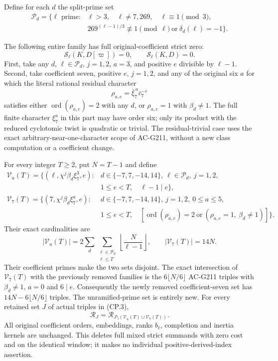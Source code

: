 Define for each $d$ the split-prime set
\[
 \begin{split}
 \mathscr P_d=\{\ell\text{ prime}:{}&\ell>3,\quad\ell\ne7,269,
       \quad\ell\equiv1\pmod3,\\
       &269^{(\ell-1)/3}\not\equiv1\pmod\ell
                            \ \text{or}\ \delta_d(\ell)=-1\}.
 \end{split}
 \tag{MQS.5}
\]

\begin{theorem}
\label{AC-G217}
The following entire family has full original-coefficient strict zero:
\[
                  \mathcal S_\ell(K,D[\varpi])=0,
                  \qquad\mathcal S_\ell(K,D)=0.
 \tag{MQS.6}
\]
First, take any $d$, $\ell\in\mathscr P_d$, $j=1,2$, $a=3$,
and positive $e$ divisible by $\ell-1$.
Second, take coefficient seven, positive $e$, $j=1,2$, and
any of the original six $a$ for which the literal rational
residual character
\[
                    \rho_{a,e}=\bar\xi_7^{\,a}\bar c_7^{-e}
 \tag{MQS.7}
\]
satisfies either $\operatorname{ord}(\rho_{a,e})=2$ with any $d$,
or $\rho_{a,e}=1$ with $\beta_d\ne1$.
The full finite character $\xi_7^a$ in this part may have
order six; only its product with the reduced cyclotomic twist is
quadratic or trivial.  The residual-trivial case uses the exact
arbitrary-near-one-character scope of AC-G211, without a new
class computation or a coefficient change.

For every integer $T\geq2$, put $N=T-1$ and define
\[
 \begin{split}
 \mathcal V_u(T)=\{(\ell,\chi^j\beta_d\xi_7^3,e):{}&d\in\{-7,7,-14,14\},
       \ \ell\in\mathscr P_d,\ j=1,2,\\
                         &1\leq e<T,\quad\ell-1\mid e\},\\
 \mathcal V_7(T)=\{(7,\chi^j\beta_d\xi_7^a,e):{}&d\in\{-7,7,-14,14\},
       \ j=1,2,\ 0\leq a\leq5,\\
                         &1\leq e<T,\quad
          [\operatorname{ord}(\rho_{a,e})=2
             \ \text{or}\ (\rho_{a,e}=1,\ \beta_d\ne1)]\}.
 \end{split}
 \tag{MQS.8}
\]
Their exact cardinalities are
\[
       |\mathcal V_u(T)|=
          2\sum_d\sum_{\substack{\ell\in\mathscr P_d\\\ell\leq T}}
                           \left\lfloor\frac{N}{\ell-1}\right\rfloor,
       \qquad |\mathcal V_7(T)|=14N.
 \tag{MQS.9}
\]
Their coefficient primes make the two sets disjoint.
The exact intersection of $\mathcal V_7(T)$ with the previously
removed families is the $6\lfloor N/6\rfloor$ AC-G211 triples
with $\beta_d\ne1$, $a=0$ and $6\mid e$.
Consequently the newly removed coefficient-seven set has
$14N-6\lfloor N/6\rfloor$ triples.  The unramified-prime set
is entirely new.  For every retained set $J$ of actual triples
in (CP.3),
\[
          \mathcal R_J=
           \mathcal R_{J\setminus(\mathcal V_u(T)\cup\mathcal V_7(T))}.
 \tag{MQS.10}
\]
All original coefficient orders, embeddings, ranks $b_\ell$,
completion and inertia kernels are unchanged.  This deletes full
mixed strict summands with zero cost and on the identical window;
it makes no individual positive-derived-index assertion.
\end{theorem}

